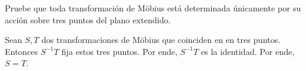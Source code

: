 \begin{exercise}
Pruebe que toda transformación de Möbius está determinada únicamente por su acción sobre tres puntos del plano extendido.
\end{exercise}

\begin{solution}
Sean $S, T$ dos transformaciones de Möbius que coinciden en en tres puntos. Entonces $S^{-1} T$ fija estos tres puntos. Por ende, $S^{-1} T$ es la identidad. Por ende, $S = T$.
\end{solution}
